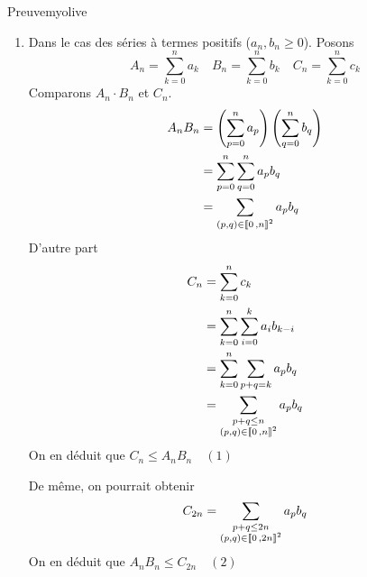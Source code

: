         \begin{demo}{Preuve}{myolive}
            \begin{enumerate}
                \item Dans le cas des séries à termes positifs ($a_n, b_n \geq 0$). Posons
                \[ A_n = \sum_{k=0}^{n} a_k \quad B_n = \sum_{k=0}^{n} b_k \quad C_n = \sum_{k=0}^{n} c_k \] 
                Comparons $A_n \cdot B_n$ et $C_n$.
                \begin{align*}
                    A_n B_n 
                    &= \left( \sum_{p=0}^{n} a_p \right) \left( \sum_{q=0}^{n} b_q \right) \\
                    &= \sum_{p=0}^{n} \sum_{q=0}^{n} a_p b_q \\
                    &= \sum_{(p,q) \in \left\llbracket 0 \, , n \right\rrbracket^2} a_p b_q 
                \end{align*}
                D’autre part 
                \begin{align*}
                    C_n 
                    &= \sum_{k=0}^{n} c_k \\
                    &= \sum_{k=0}^{n} \sum_{i = 0}^{k} a_i b_{k-i} \\
                    &= \sum_{k=0}^{n} \sum_{p+q = k} a_p b_q \\
                    &= \sum_{\substack{p+q \leq n \\ (p,q) \in \left\llbracket 0 \, , n \right\rrbracket^2}} a_p b_q
                \end{align*}
                On en déduit que $C_n \leq A_n B_n \quad (1)$
    
                De même, on pourrait obtenir 
                \[ C_{2n} = \sum_{\substack{p+q \leq 2n \\ (p,q) \in \left\llbracket 0 \, , 2n \right\rrbracket^2}} a_p b_q \] 
                On en déduit que $A_n B_n \leq C_{2n} \quad (2)$
    

\end{enumerate}
\end{demo}
